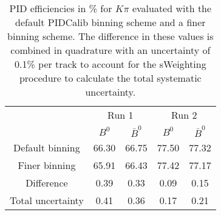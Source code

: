 \begin{table}
    \centering
    \begin{tabular}{ccccc}
    \toprule
& \multicolumn{2}{c}{Run 1} & \multicolumn{2}{c}{Run 2}\\
& $B^0$ & $\bar{B}^0$ & $B^0$ & $\bar{B}^0$\\
    \midrule
Default binning & 66.30 & 66.75 & 77.50 & 77.32\\
Finer binning & 65.91 & 66.43 & 77.42 & 77.17\\
Difference & 0.39 & 0.33 & 0.09 & 0.15\\
Total uncertainty & 0.41 & 0.36 & 0.17 & 0.21\\
    \bottomrule
    \end{tabular}
    \caption{PID efficiencies in \% for $K\pi$ evaluated with the default PIDCalib binning scheme and a finer binning scheme. The difference in these values is combined in quadrature with an uncertainty of 0.1\% per track to account for the sWeighting procedure to calculate the total systematic uncertainty.}
\label{tab:final_PID_Kpi}
\end{table}
